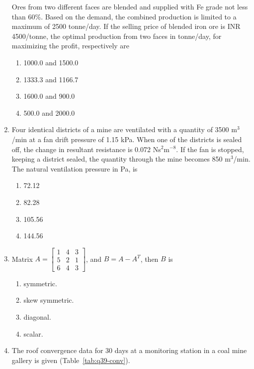\documentclass[journal]{IEEEtran}
\begin{document}
\begin{enumerate}[leftmargin=0pt]

Ores from two different faces are blended and supplied with Fe grade not less than 60\%.
Based on the demand, the combined production is limited to a maximum of 2500 tonne/day.
If the selling price of blended iron ore is INR 4500/tonne, the optimal production from
two faces in tonne/day, for maximizing the profit, respectively are

\begin{enumerate}
  \item 1000.0 and 1500.0
  \item 1333.3 and 1166.7
  \item 1600.0 and 900.0
  \item 500.0 and 2000.0
\end{enumerate}

\hfill{}

\hfill{}
\item Four identical districts of a mine are ventilated with a quantity of 3500 m$^3$/min at a fan drift pressure of 1.15 kPa. When one of the districts is sealed off, the change in resultant resistance is 0.072 Ns$^2$m$^{-8}$. If the fan is stopped, keeping a district sealed, the quantity through the mine becomes 850 m$^3$/min. The natural ventilation pressure in Pa, is
\begin{enumerate}
\item 72.12
\item 82.28
\item 105.56
\item 144.56
\end{enumerate}
\hfill{}
\item Matrix $A=\begin{bmatrix}1&4&3\\ 5&2&1\\ 6&4&3\end{bmatrix}$, and $B=A-A^{T}$, then $B$ is
\begin{enumerate}
\item symmetric.
\item skew symmetric.
\item diagonal.
\item scalar.
\end{enumerate}
\hfill{}

\item The roof convergence data for 30 days at a monitoring station in a coal mine gallery is given (Table~\ref{tab:q39-conv}).


\end{enumerate}
\end{document}
